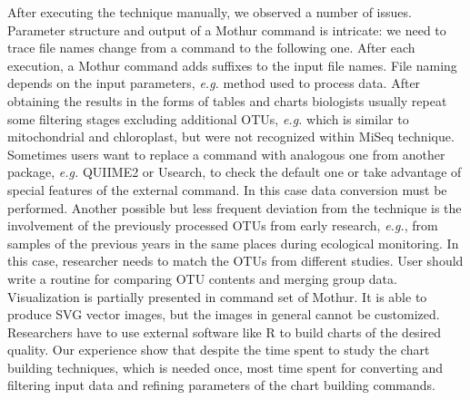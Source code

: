 \documentclass[a4paper]{jpconf}
\begin{document}
After executing the technique manually, we observed a number of issues. Parameter structure and output of a Mothur command is intricate: we need to trace file names change from a command to the following one.  After each execution, a Mothur command adds suffixes to the input file names.  File naming depends on the input parameters, \emph{e.g.} method used to process data. %
After obtaining the results in the forms of tables and charts biologists usually repeat some filtering stages excluding additional OTUs, \emph{e.g.} which is similar to mitochondrial and chloroplast, but were not recognized within MiSeq technique.
Sometimes users want to replace a command with analogous one from another package, \emph{e.g.} QUIIME2 or Usearch, to check the default one or take advantage of special features of the external command. In this case data conversion must be performed.
Another possible but less frequent deviation from the technique is the involvement of the previously processed OTUs from early research, \emph{e.g.}, from samples of the previous years in the same places during ecological monitoring. In this case, researcher needs to match the OTUs from different studies. User should write a routine for comparing OTU contents and merging group data.
Visualization is partially presented in command set of Mothur.  It is able to produce SVG vector images, but the images in general cannot be customized.  Researchers have to use external software like R to build charts of the desired quality.  Our experience show that despite the time spent to study the chart building techniques, which is needed once, most time spent for converting and filtering input data and refining parameters of the chart building commands.

\end{document}
